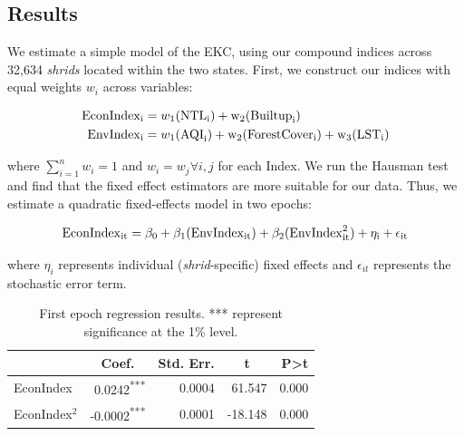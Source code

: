 \documentclass[a4paper,12pt]{article}
\begin{document}
\subsection{Results}

We estimate a simple model of the EKC, using our compound indices across 32,634 \textit{shrids} located within the two states. First, we construct our indices with equal weights $w_i$ across variables:

\begin{align*}
    \rm{EconIndex}_i &=  w_1(\rm{NTL}_i) + w_2(\rm{Builtup}_i) \\
    \rm{EnvIndex}_i &=  w_1(\rm{AQI}_i) + w_2(\rm{ForestCover}_i) + w_3(\rm{LST}_i)
\end{align*}

where $\sum_{i=1}^{n}w_i = 1$ and $w_i = w_j \forall i, j$ for each Index. We run the Hausman test and find that the fixed effect estimators are more suitable for our data. Thus, we estimate a quadratic fixed-effects model in two epochs:

\[
    \rm{EconIndex}_{it} = \beta_0 + \beta_1(\rm{EnvIndex}_{it}) + \beta_2(\rm{EnvIndex}_{it}^2) + \eta_i + \epsilon_{it} 
\]

where $\eta_i$ represents individual (\textit{shrid}-specific) fixed effects and $\epsilon_{it}$ represents the stochastic error term.

\begin{table}[h]
    \centering
    \begin{tabular}{l|rrrr}
    \hline
    \multicolumn{1}{c}{\textbf{}} & \multicolumn{1}{c}{\textbf{Coef.}} & \multicolumn{1}{c}{\textbf{Std. Err.}} & \multicolumn{1}{c}{\textbf{t}} & \textbf{P\textgreater{}t} \\ \hline
    EconIndex                     & 0.0242\textsuperscript{***}                             & 0.0004                                 & 61.547     & 0.000                     \\ 
    EconIndex$^2$                   & -0.0002\textsuperscript{***}                            & 0.0001                                 & -18.148    & 0.000                    
    \\ \hline        
\end{tabular}
\caption{First epoch regression results. *** represent significance at the 1\% level.}
\label{tab:epoch1}
\end{table}
\end{document}
